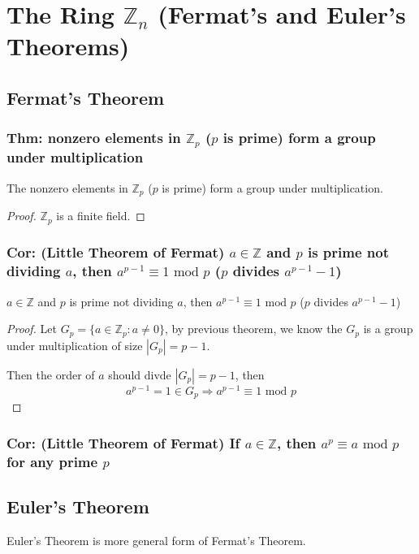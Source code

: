 \documentclass[11pt]{elegantbook}
\begin{document}
\chapter{The Ring $\mathbb{Z}_n$ (Fermat's and Euler's Theorems)}
\section{Fermat's Theorem}
\subsection{Thm: nonzero elements in $\mathbb{Z}_p$ ($p$ is prime) form a group under multiplication}
\begin{theorem}
    The nonzero elements in $\mathbb{Z}_p$ ($p$ is prime) form a group under multiplication.
\end{theorem}
\begin{proof}
$\mathbb{Z}_p$ is a finite field.
\end{proof}

\subsection{Cor: (Little Theorem of Fermat) $a\in \mathbb{Z}$ and $p$ is prime not dividing $a$, then $a^{p-1}\equiv 1 \text{ mod } p$ ($p$ divides $a^{p-1}-1$)}
\begin{corollary}
    $a\in \mathbb{Z}$ and $p$ is prime not dividing $a$, then $a^{p-1}\equiv 1 \text{ mod } p$ ($p$ divides $a^{p-1}-1$)
\end{corollary}
\begin{proof}
Let $G_p=\{a\in \mathbb{Z}_p: a\neq 0\}$, by previous theorem, we know the $G_p$ is a group under multiplication of size $|G_p|=p-1$.

Then the order of $a$ should divde $|G_p|=p-1$, then
$$a^{p-1}=1\in G_p \Rightarrow	a^{p-1}\equiv 1 \text{ mod } p$$
\end{proof}
\subsection{Cor: (Little Theorem of Fermat) If $a\in \mathbb{Z}$, then $a^p\equiv a \text{ mod }p$ for any prime $p$}

\section{Euler's Theorem}
Euler's Theorem is more general form of Fermat's Theorem.
\end{document}
